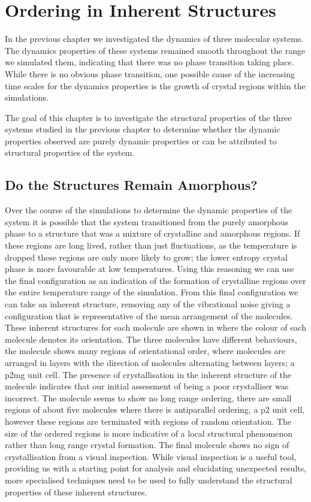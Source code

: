 \chapter{Ordering in Inherent Structures}

In the previous chapter we investigated the dynamics of three molecular systems. The dynamics properties of these systems remained smooth throughout the range we simulated them, indicating that there was no phase transition taking place. While there is no obvious phase transition, one possible cause of the increasing time scales for the dynamics properties is the growth of crystal regions within the simulations.

The goal of this chapter is to investigate the structural properties of the three systems studied in the previous chapter to determine whether the dynamic properties observed are purely dynamic properties or can be attributed to structural properties of the system.

\section{Do the Structures Remain Amorphous?}

Over the course of the simulations to determine the dynamic properties of the system it is possible that the system transitioned from the purely amorphous phase to a structure that was a mixture of crystalline and amorphous regions. If these regions are long lived, rather than just fluctuations, as the temperature is dropped these regions are only more likely to grow; the lower entropy crystal phase is more favourable at low temperatures. Using this reasoning we can use the final configuration as an indication of the formation of crystalline regions over the entire temperature range of the simulation. From this final configuration we can take an inherent structure, removing any of the vibrational noise giving a configuration that is representative of the mean arrangement of the molecules. These inherent structures for each molecule are shown in  where the colour of each molecule denotes its orientation. The three molecules have different behaviours, the \sone molecule  shows many regions of orientational order, where molecules are arranged in layers with the direction of molecules alternating between layers; a p2mg unit cell. The presence of crystallisation in the inherent structure of the \sone molecule indicates that our initial assessment of being a poor crystalliser was incorrect. The \scon molecule  seems to show no long range ordering, there are small regions of about five molecules where there is antiparallel ordering, a p2 unit cell, however these regions are terminated with regions of random orientation. The size of the ordered regions is more indicative of a local structural phenomenon rather than long range crystal formation. The final molecule \tri {} shows no sign of crystallisation from a visual inspection. While visual inspection is a useful tool, providing us with a starting point for analysis and elucidating unexpected results, more specialised techniques need to be used to fully understand the structural properties of these inherent structures.

